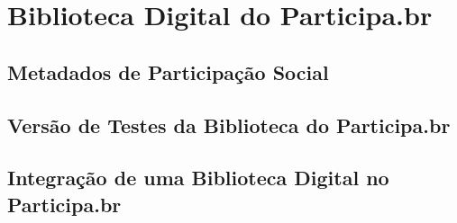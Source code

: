\chapter{Biblioteca Digital do Participa.br}

\section{Metadados de Participação Social}

\section{Versão de Testes da Biblioteca do Participa.br}

\section{Integração de uma Biblioteca Digital no Participa.br}



